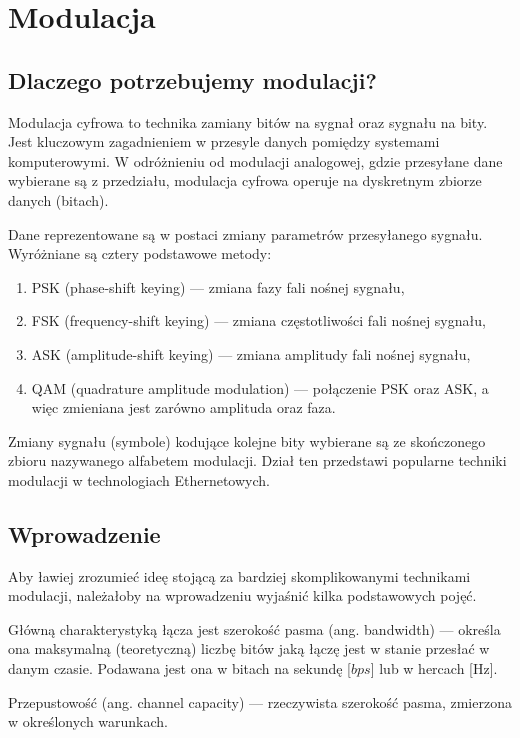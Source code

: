 \section{Modulacja}

\subsection{Dlaczego potrzebujemy modulacji?}

Modulacja cyfrowa to technika zamiany bitów na sygnał oraz sygnału na bity. Jest kluczowym zagadnieniem w przesyle danych pomiędzy systemami komputerowymi. W odróżnieniu od modulacji analogowej, gdzie przesyłane dane wybierane są z przedziału,
modulacja cyfrowa operuje na dyskretnym zbiorze danych (bitach).

Dane reprezentowane są w postaci zmiany parametrów przesyłanego sygnału. Wyróżniane są cztery podstawowe metody:

\begin{enumerate}
    \item PSK (phase-shift keying) --- zmiana fazy fali nośnej sygnału,
    \item FSK (frequency-shift keying) --- zmiana częstotliwości fali nośnej sygnału,
    \item ASK (amplitude-shift keying) --- zmiana amplitudy fali nośnej sygnału,
    \item QAM (quadrature amplitude modulation) --- połączenie PSK oraz ASK, a więc zmieniana jest zarówno amplituda oraz faza.
\end{enumerate}

Zmiany sygnału (symbole) kodujące kolejne bity wybierane są ze skończonego zbioru nazywanego alfabetem modulacji.
Dział ten przedstawi popularne techniki modulacji w technologiach Ethernetowych.

\subsection{Wprowadzenie}

Aby ławiej zrozumieć ideę stojącą za bardziej skomplikowanymi technikami modulacji, należałoby na wprowadzeniu wyjaśnić kilka podstawowych pojęć.

Główną charakterystyką łącza jest szerokość pasma (ang. bandwidth) --- określa ona maksymalną (teoretyczną) liczbę bitów jaką łączę jest w stanie przesłać w danym czasie. Podawana jest ona w bitach na sekundę [$bps$] lub w hercach [Hz].

Przepustowość (ang. channel capacity) --- rzeczywista szerokość pasma, zmierzona w określonych warunkach.

